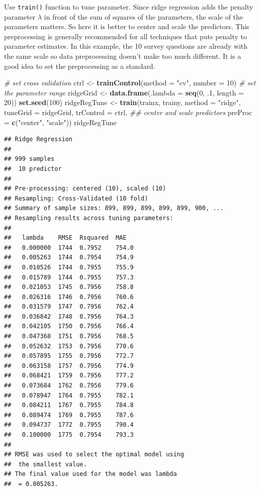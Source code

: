 \documentclass[12pt,]{krantz}
\makeatletter
\newenvironment{Shaded}{\begin{snugshade}}{\end{snugshade}}
\newcommand{\CommentTok}[1]{\textcolor[rgb]{0.37,0.37,0.37}{\textit{#1}}}
\newcommand{\DataTypeTok}[1]{\textcolor[rgb]{0.27,0.27,0.27}{#1}}
\newcommand{\DecValTok}[1]{\textcolor[rgb]{0.06,0.06,0.06}{#1}}
\newcommand{\FloatTok}[1]{\textcolor[rgb]{0.06,0.06,0.06}{#1}}
\newcommand{\KeywordTok}[1]{\textcolor[rgb]{0.27,0.27,0.27}{\textbf{#1}}}
\newcommand{\NormalTok}[1]{#1}
\newcommand{\StringTok}[1]{\textcolor[rgb]{0.5,0.5,0.5}{#1}}
\newenvironment{kframe}{%
\medskip{}
\setlength{\fboxsep}{.8em}
 \def\at@end@of@kframe{}%
 \ifinner\ifhmode%
  \def\at@end@of@kframe{\end{minipage}}%
  \begin{minipage}{\columnwidth}%
 \fi\fi%
 \def\FrameCommand##1{\hskip\@totalleftmargin \hskip-\fboxsep
 \colorbox{shadecolor}{##1}\hskip-\fboxsep
     \hskip-\linewidth \hskip-\@totalleftmargin \hskip\columnwidth}%
 \MakeFramed {\advance\hsize-\width
   \@totalleftmargin\z@ \linewidth\hsize
   \@setminipage}}%
 {\par\unskip\endMakeFramed%
 \at@end@of@kframe}
\renewenvironment{Shaded}{\begin{kframe}}{\end{kframe}}
\makeatother
\begin{document}
Use \texttt{train()} function to tune parameter. Since ridge regression adds the penalty parameter \(\lambda\) in front of the sum of squares of the parameters, the scale of the parameters matters. So here it is better to center and scale the predictors. This preprocessing is generally recommended for all techniques that puts penalty to parameter estimates. In this example, the 10 survey questions are already with the same scale so data preprocessing doesn't make too much different. It is a good idea to set the preprocessing as a standard.

\begin{Shaded}
\begin{Highlighting}[]
\CommentTok{# set cross validation}
\NormalTok{ctrl <-}\StringTok{ }\KeywordTok{trainControl}\NormalTok{(}\DataTypeTok{method =} \StringTok{"cv"}\NormalTok{, }\DataTypeTok{number =} \DecValTok{10}\NormalTok{)}
\CommentTok{# set the parameter range }
\NormalTok{ridgeGrid <-}\StringTok{ }\KeywordTok{data.frame}\NormalTok{(}\DataTypeTok{.lambda =} \KeywordTok{seq}\NormalTok{(}\DecValTok{0}\NormalTok{, }\FloatTok{.1}\NormalTok{, }\DataTypeTok{length =} \DecValTok{20}\NormalTok{))}
\KeywordTok{set.seed}\NormalTok{(}\DecValTok{100}\NormalTok{)}
\NormalTok{ridgeRegTune <-}\StringTok{ }\KeywordTok{train}\NormalTok{(trainx, trainy,}
                      \DataTypeTok{method =} \StringTok{"ridge"}\NormalTok{,}
                      \DataTypeTok{tuneGrid =}\NormalTok{ ridgeGrid,}
                      \DataTypeTok{trControl =}\NormalTok{ ctrl,}
                      \CommentTok{## center and scale predictors}
                      \DataTypeTok{preProc =} \KeywordTok{c}\NormalTok{(}\StringTok{"center"}\NormalTok{, }\StringTok{"scale"}\NormalTok{))}
\NormalTok{ridgeRegTune}
\end{Highlighting}
\end{Shaded}

\begin{verbatim}
## Ridge Regression 
## 
## 999 samples
##  10 predictor
## 
## Pre-processing: centered (10), scaled (10) 
## Resampling: Cross-Validated (10 fold) 
## Summary of sample sizes: 899, 899, 899, 899, 899, 900, ... 
## Resampling results across tuning parameters:
## 
##   lambda    RMSE  Rsquared  MAE  
##   0.000000  1744  0.7952    754.0
##   0.005263  1744  0.7954    754.9
##   0.010526  1744  0.7955    755.9
##   0.015789  1744  0.7955    757.3
##   0.021053  1745  0.7956    758.8
##   0.026316  1746  0.7956    760.6
##   0.031579  1747  0.7956    762.4
##   0.036842  1748  0.7956    764.3
##   0.042105  1750  0.7956    766.4
##   0.047368  1751  0.7956    768.5
##   0.052632  1753  0.7956    770.6
##   0.057895  1755  0.7956    772.7
##   0.063158  1757  0.7956    774.9
##   0.068421  1759  0.7956    777.2
##   0.073684  1762  0.7956    779.6
##   0.078947  1764  0.7955    782.1
##   0.084211  1767  0.7955    784.8
##   0.089474  1769  0.7955    787.6
##   0.094737  1772  0.7955    790.4
##   0.100000  1775  0.7954    793.3
## 
## RMSE was used to select the optimal model using
##  the smallest value.
## The final value used for the model was lambda
##  = 0.005263.
\end{verbatim}
\end{document}
